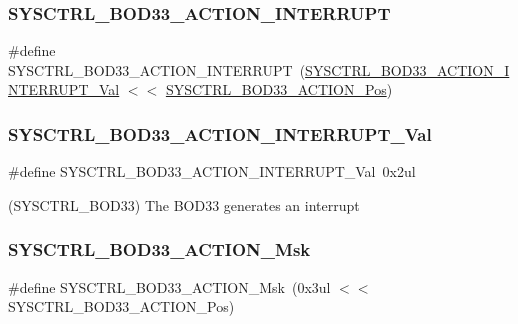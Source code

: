 \subsubsection{\texorpdfstring{SYSCTRL\_BOD33\_ACTION\_INTERRUPT}{SYSCTRL\_BOD33\_ACTION\_INTERRUPT}}
{\footnotesize\ttfamily \#define S\+Y\+S\+C\+T\+R\+L\+\_\+\+B\+O\+D33\+\_\+\+A\+C\+T\+I\+O\+N\+\_\+\+I\+N\+T\+E\+R\+R\+U\+PT~(\mbox{\hyperlink{group___s_a_m_d21___s_y_s_c_t_r_l_ga834863e23c2d073164c47763674c61ab}{S\+Y\+S\+C\+T\+R\+L\+\_\+\+B\+O\+D33\+\_\+\+A\+C\+T\+I\+O\+N\+\_\+\+I\+N\+T\+E\+R\+R\+U\+P\+T\+\_\+\+Val}} $<$$<$ \mbox{\hyperlink{group___s_a_m_d21___s_y_s_c_t_r_l_ga6c20697ad258d59880069fb26f672189}{S\+Y\+S\+C\+T\+R\+L\+\_\+\+B\+O\+D33\+\_\+\+A\+C\+T\+I\+O\+N\+\_\+\+Pos}})}

\mbox{\label{group___s_a_m_d21___s_y_s_c_t_r_l_ga834863e23c2d073164c47763674c61ab}} 
\subsubsection{\texorpdfstring{SYSCTRL\_BOD33\_ACTION\_INTERRUPT\_Val}{SYSCTRL\_BOD33\_ACTION\_INTERRUPT\_Val}}
{\footnotesize\ttfamily \#define S\+Y\+S\+C\+T\+R\+L\+\_\+\+B\+O\+D33\+\_\+\+A\+C\+T\+I\+O\+N\+\_\+\+I\+N\+T\+E\+R\+R\+U\+P\+T\+\_\+\+Val~0x2ul}



(S\+Y\+S\+C\+T\+R\+L\+\_\+\+B\+O\+D33) The B\+O\+D33 generates an interrupt 

\mbox{\label{group___s_a_m_d21___s_y_s_c_t_r_l_ga85f369a6fbff36f2617d7d4a3e66a784}} 
\subsubsection{\texorpdfstring{SYSCTRL\_BOD33\_ACTION\_Msk}{SYSCTRL\_BOD33\_ACTION\_Msk}}
{\footnotesize\ttfamily \#define S\+Y\+S\+C\+T\+R\+L\+\_\+\+B\+O\+D33\+\_\+\+A\+C\+T\+I\+O\+N\+\_\+\+Msk~(0x3ul $<$$<$ S\+Y\+S\+C\+T\+R\+L\+\_\+\+B\+O\+D33\+\_\+\+A\+C\+T\+I\+O\+N\+\_\+\+Pos)}


